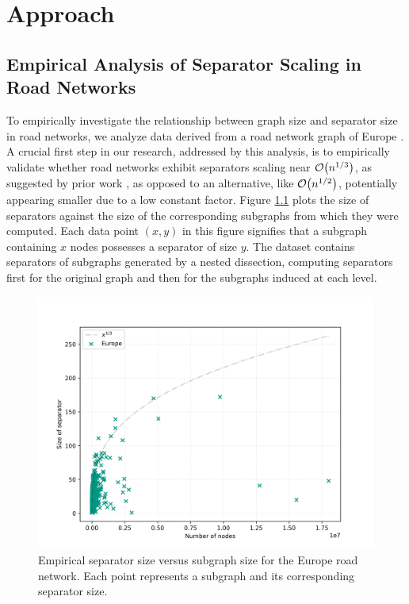 \chapter{Approach}
\label{ch:experimental_analysis}


\section{Empirical Analysis of Separator Scaling in Road Networks}
\label{sec:empirical_analysis}

To empirically investigate the relationship between graph size and separator size in road networks, we analyze data derived from a road network graph of Europe \cite{ptv_group_dimacs-europe_2009}.
A crucial first step in our research, addressed by this analysis, is to empirically validate whether road networks exhibit separators scaling near \(\mathcal{O}\!\left(n^{1/3}\right)\), as suggested by prior work \cite{dibbelt_customizable_2016}, as opposed to an alternative, like \(\mathcal{O}\!\left(n^{1/2}\right)\), potentially appearing smaller due to a low constant factor.
Figure \cref{fig:separator_size_vs_graph_size} plots the size of separators against the size of the corresponding subgraphs from which they were computed.
Each data point \( (x, y) \) in this figure signifies that a subgraph containing \( x \) nodes possesses a separator of size \( y \).
The dataset contains separators of subgraphs generated by a nested dissection, computing separators first for the original graph and then for the subgraphs induced at each level.

\begin{figure}
	\centering
	\includegraphics[width=0.7\linewidth]{graphics/Europe.png}
	\caption{Empirical separator size versus subgraph size for the Europe road network. Each point represents a subgraph and its corresponding separator size.}
	\label{fig:separator_size_vs_graph_size}
\end{figure}

